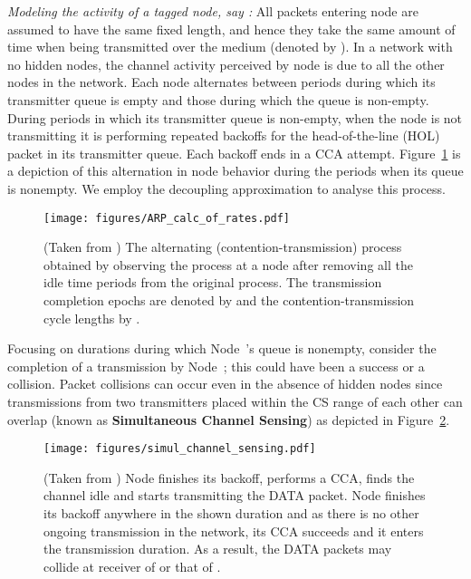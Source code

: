 \documentclass[12pt, draftclsnofoot, onecolumn]{IEEEtran}
\newcommand{\gap}{\vspace{2mm}}
\begin{document}
\gap
\noindent
\emph{Modeling the activity of a tagged node, say :} All packets entering node  are assumed to have the same fixed length, and hence they take the same amount of time when being transmitted over the medium (denoted by ). In a network with no hidden nodes, the channel activity perceived by node  is due to all the other nodes in the network. Each node alternates between periods during which its transmitter queue is empty and those during which the queue is non-empty. During periods in which its transmitter queue is non-empty, when the node is not transmitting it is performing repeated backoffs for the head-of-the-line (HOL) packet in its transmitter queue. Each backoff ends in a CCA attempt. Figure~\ref{fig:ARP_calc_of_rates} is a depiction of this alternation in node behavior during the periods when its queue is nonempty. We employ the decoupling approximation to analyse this process.
\begin{figure}[h]
\begin{center}
\texttt{[image: figures/ARP\_calc\_of\_rates.pdf]}
\caption{(Taken from \cite{srivastava}) The alternating (contention-transmission) process obtained by observing the process at a node  after removing all the idle time periods from the original process. The transmission completion epochs are denoted by  and the contention-transmission cycle lengths by .}
\label{fig:ARP_calc_of_rates}
\vspace{-5mm}
\end{center}
\end{figure}

Focusing on durations during which Node~'s queue is nonempty, consider the completion of a transmission by Node~; this could have been a success or a collision. Packet collisions can occur even in the absence of hidden nodes since transmissions from two transmitters placed within the CS range of each other can overlap (known as \textbf{Simultaneous Channel Sensing}) as depicted in Figure~\ref{fig:simul_channel}. 
\begin{figure}[h]
\begin{center}
	\texttt{[image: figures/simul\_channel\_sensing.pdf]}
	\caption{(Taken from \cite{srivastava}) Node  finishes its backoff, performs a CCA, finds the channel idle and starts transmitting the DATA packet. Node  finishes its backoff anywhere in the shown  duration and as there is no other ongoing transmission in the network, its CCA succeeds and it enters the transmission duration. As a result, the DATA packets may collide at receiver of  or that of .}
	\label{fig:simul_channel}
	\vspace{-5mm}
\end{center}
\end{figure}
\end{document}

